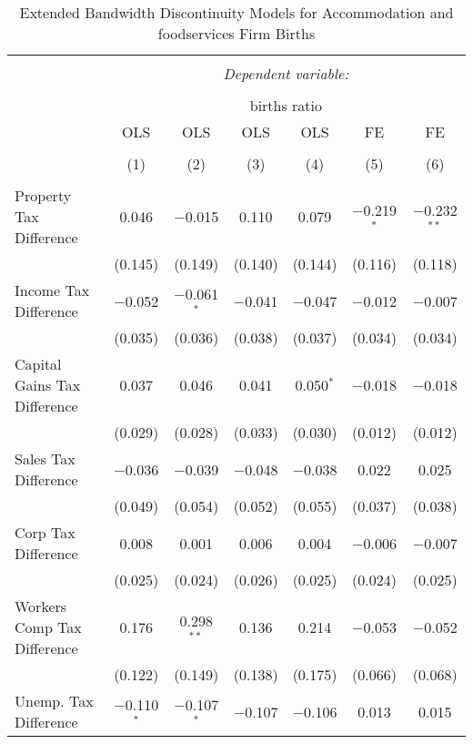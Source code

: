
\begin{table}[!htbp] \centering 
  \caption{Extended Bandwidth Discontinuity Models for  Accommodation and foodservices Firm Births} 
  \label{72eb} 
\begin{tabular}{@{\extracolsep{5pt}}lcccccc} 
\\[-1.8ex]\hline 
\hline \\[-1.8ex] 
 & \multicolumn{6}{c}{\textit{Dependent variable:}} \\ 
\cline{2-7} 
\\[-1.8ex] & \multicolumn{6}{c}{births ratio} \\ 
 & OLS & OLS & OLS & OLS & FE & FE \\ 
\\[-1.8ex] & (1) & (2) & (3) & (4) & (5) & (6)\\ 
\hline \\[-1.8ex] 
 Property Tax Difference & 0.046 & $-$0.015 & 0.110 & 0.079 & $-$0.219$^{*}$ & $-$0.232$^{**}$ \\ 
  & (0.145) & (0.149) & (0.140) & (0.144) & (0.116) & (0.118) \\ 
  Income Tax Difference & $-$0.052 & $-$0.061$^{*}$ & $-$0.041 & $-$0.047 & $-$0.012 & $-$0.007 \\ 
  & (0.035) & (0.036) & (0.038) & (0.037) & (0.034) & (0.034) \\ 
  Capital Gains Tax Difference & 0.037 & 0.046 & 0.041 & 0.050$^{*}$ & $-$0.018 & $-$0.018 \\ 
  & (0.029) & (0.028) & (0.033) & (0.030) & (0.012) & (0.012) \\ 
  Sales Tax Difference & $-$0.036 & $-$0.039 & $-$0.048 & $-$0.038 & 0.022 & 0.025 \\ 
  & (0.049) & (0.054) & (0.052) & (0.055) & (0.037) & (0.038) \\ 
  Corp Tax Difference & 0.008 & 0.001 & 0.006 & 0.004 & $-$0.006 & $-$0.007 \\ 
  & (0.025) & (0.024) & (0.026) & (0.025) & (0.024) & (0.025) \\ 
  Workers Comp Tax Difference & 0.176 & 0.298$^{**}$ & 0.136 & 0.214 & $-$0.053 & $-$0.052 \\ 
  & (0.122) & (0.149) & (0.138) & (0.175) & (0.066) & (0.068) \\ 
  Unemp. Tax Difference & $-$0.110$^{*}$ & $-$0.107$^{*}$ & $-$0.107 & $-$0.106 & 0.013 & 0.015 \\ 

\end{tabular}
\end{table}
